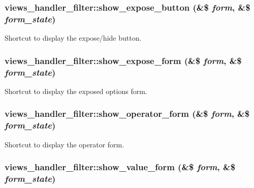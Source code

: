 {\subsubsection[{show\_\-expose\_\-button}]{\setlength{\rightskip}{0pt plus 5cm}views\_\-handler\_\-filter::show\_\-expose\_\-button (\&\$ {\em form}, \/  \&\$ {\em form\_\-state})}}
\label{classviews__handler__filter_fa388297472d32d4bcb976bf3515d16a}


Shortcut to display the expose/hide button. \hypertarget{classviews__handler__filter_9499b1d69007e5921acef6277da4fc1d}{
\subsubsection[{show\_\-expose\_\-form}]{\setlength{\rightskip}{0pt plus 5cm}views\_\-handler\_\-filter::show\_\-expose\_\-form (\&\$ {\em form}, \/  \&\$ {\em form\_\-state})}}
\label{classviews__handler__filter_9499b1d69007e5921acef6277da4fc1d}


Shortcut to display the exposed options form. \hypertarget{classviews__handler__filter_d24ef0dda8c7441b9b471aec9052a0a5}{
\subsubsection[{show\_\-operator\_\-form}]{\setlength{\rightskip}{0pt plus 5cm}views\_\-handler\_\-filter::show\_\-operator\_\-form (\&\$ {\em form}, \/  \&\$ {\em form\_\-state})}}
\label{classviews__handler__filter_d24ef0dda8c7441b9b471aec9052a0a5}


Shortcut to display the operator form. \hypertarget{classviews__handler__filter_37f4961abdb70886be8229fbfa35038a}{
\subsubsection[{show\_\-value\_\-form}]{\setlength{\rightskip}{0pt plus 5cm}views\_\-handler\_\-filter::show\_\-value\_\-form (\&\$ {\em form}, \/  \&\$ {\em form\_\-state})}}
\label{classviews__handler__filter_37f4961abdb70886be8229fbfa35038a}


